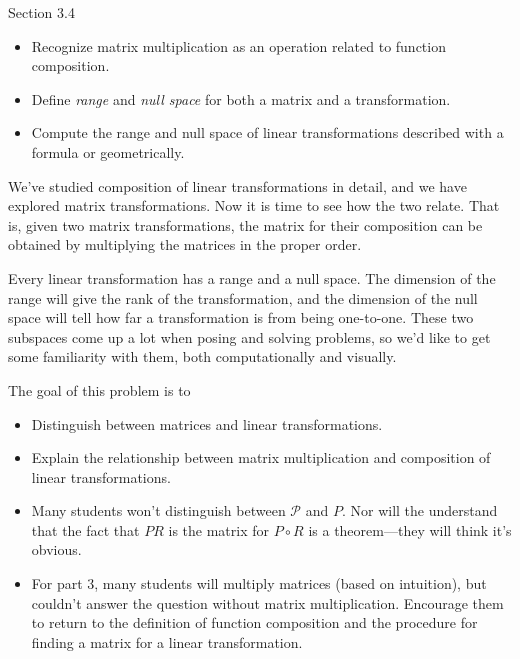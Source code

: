 \begin{lesson}

	Section 3.4

	\begin{itemize}
		\item Recognize matrix multiplication as an operation related to function composition.
		\item Define \emph{range} and \emph{null space} for both a matrix and a transformation.
		\item Compute the range and null space of linear transformations described
			with a formula or geometrically.
	\end{itemize}

		We've studied composition of linear transformations in detail, and we have explored
		matrix transformations. Now it is time to see how the two relate. That is, given
		two matrix transformations, the matrix for their composition can be obtained by
		multiplying the matrices in the proper order.

		Every linear transformation has a range and a null space. The dimension of the range
		will give the rank of the transformation, and the dimension of the null space
		will tell how far a transformation is from being one-to-one. These two subspaces come up
		a lot when posing and solving problems, so we'd like to get some familiarity with them,
		both computationally
		and visually.


\end{lesson}
	\question
	\begin{annotation}
		\begin{goals}

			The goal of this problem is to
			\begin{itemize}
				\item Distinguish between matrices and linear transformations.
				\item Explain the relationship between matrix multiplication and composition
					of linear transformations.
			\end{itemize}
		\end{goals}

		\begin{notes}
			\begin{itemize}
				\item Many students won't distinguish between $\mathcal P$ and $P$. Nor
					will the understand that the fact that $PR$ is the matrix for $P\circ R$
					is a theorem---they will think it's obvious.
				\item For part 3, many students will multiply matrices (based on intuition),
					but couldn't answer the question without matrix multiplication. Encourage
					them to return to the definition of function composition and the procedure
					for finding a matrix for a linear transformation.
			\end{itemize}
		\end{notes}
	\end{annotation}
